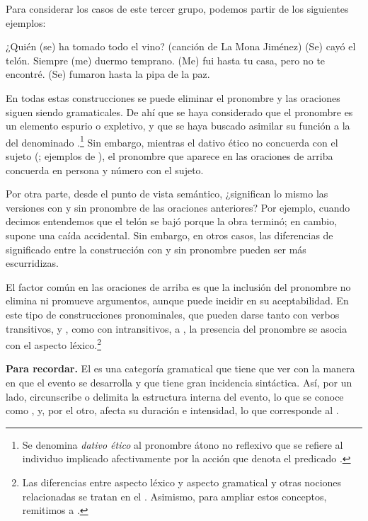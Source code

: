 Para considerar los casos de este tercer grupo, podemos partir de los siguientes
ejemplos:

\begin{exe}
  \ex\label{ex:10-vino} ¿Quién (se) ha tomado todo el vino? (canción de La Mona
      Jiménez)
  \ex\label{ex:10-telon} (Se) cayó el telón.
  \ex\label{ex:10-duermo} Siempre (me) duermo temprano.
  \ex\label{ex:10-fui} (Me) fui hasta tu casa, pero no te encontré.
  \ex\label{ex:10-pipa} (Se) fumaron hasta la pipa de la paz.
\end{exe}

En todas estas construcciones se puede eliminar el pronombre y las oraciones
siguen siendo gramaticales. De ahí que se haya considerado que el pronombre es
un elemento espurio o expletivo, y que se haya buscado asimilar su función a la
del denominado .\footnote{Se denomina \textit{dativo ético}
al pronombre átono no reflexivo que se refiere al individuo implicado
afectivamente por la acción que denota el predicado
\parencite[102]{bosque2019}.} Sin embargo, mientras el dativo ético no concuerda
con el sujeto (;
ejemplos de \cite[102]{bosque2019}), el pronombre que aparece en las oraciones
de arriba concuerda en persona y número con el sujeto.

Por otra parte, desde el punto de vista semántico, ¿significan lo mismo las
versiones con y sin pronombre de las oraciones anteriores? Por ejemplo, cuando
decimos  entendemos que el telón se bajó porque la obra
terminó; en cambio,  supone una caída accidental. Sin
embargo, en otros casos, las diferencias de significado entre la construcción con
y sin pronombre pueden ser más escurridizas.

El factor común en las oraciones de arriba es que la inclusión del pronombre no
elimina ni promueve argumentos, aunque puede incidir en su aceptabilidad. En
este tipo de construcciones pronominales, que pueden darse tanto con verbos
transitivos,  y , como con intransitivos,
 a , la presencia del pronombre se asocia
con el aspecto léxico.\footnote{Las diferencias entre aspecto léxico y aspecto
gramatical y otras nociones relacionadas se tratan en el . Asimismo,
para ampliar estos conceptos, remitimos a \textcite{debin2018}.}

\begin{destacado}
\textbf{Para recordar.} El  es una categoría gramatical que
tiene que ver con la manera en que el evento se desarrolla y que tiene gran
incidencia sintáctica. Así, por un lado, circunscribe o delimita la estructura
interna del evento, lo que se conoce como , y, por
el otro, afecta su duración e intensidad, lo que corresponde al .
\end{destacado}

